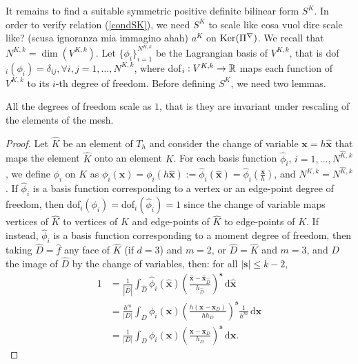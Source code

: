 It remains to find a suitable symmetric positive definite bilinear form $S^K$. In order to verify relation (\ref{condSK}), we need $S^K$ to scale like {\color{red} cosa vuol dire scale like? (scusa ignoranza mia immagino ahah)} $a^K$ on ${\rm Ker}(\Pi^\nabla)$. We recall that $N^{K,k} = \dim(V^{K,k})$. Let $\{\phi_i\}_{i=1}^{N^{K,k}}$ be the Lagrangian basis of $V^{K,k}$, that is dof$_i(\phi_i)=\delta_{ij}, \forall i,j=1,\ldots,N^{K,k}$, where dof$_i:V^{K,k}\rightarrow \mathbb{R}$ maps each function of $V^{K,k}$ to its $i$-th degree of freedom. Before defining $S^K$, we need two lemmas.

\begin{lemma}\label{lemma1}
All the degrees of freedom scale as $1$, that is they are invariant under rescaling of the elements of the mesh. 
\end{lemma}
\begin{proof}
Let $\hat{K}$ be an element of $T_h$ and consider the change of variable $\mathbf{x}=h\hat{\mathbf{x}}$ that maps the element $\hat{K}$ onto an element $K$. For each basis function $\hat{\phi}_i$, $i=1,\ldots,N^{\hat{K},k}$, we define $\phi_i$ on $K$ as $\phi_i(\mathbf{x}) = \phi_i(h\mathbf{\hat{x}}) := \hat{\phi}_i(\hat{\mathbf{x}}) = \hat{\phi}_i\left(\frac{\mathbf{x}}{h}\right)$, and $N^{K,k}=N^{\hat{K},k}$. If $\hat{\phi}_i$ is a basis function corresponding to a vertex or an edge-point degree of freedom, then dof$_i(\phi_i)=$dof$_i(\hat{\phi}_i) = 1$ since the change of variable maps vertices of $\hat{K}$ to vertices of $K$ and edge-points of $\hat{K}$ to edge-points of $K$. If instead, $\hat{\phi}_i$ is a basis function corresponding to a moment degree of freedom, then taking $\hat{D}=\hat{f}$ any face of $\hat{K}$ (if $d=3$) and $m=2$, or $\hat{D}=\hat{K}$ and $m=3$, and $D$ the image of $\hat{D}$ by the change of variables, then: for all $|\mathbf{s}|\leq k-2$, 
\begin{align*}
1&=\frac{1}{|\hat{D}|}\int_{\hat{D}} \hat{\phi}_i(\mathbf{\hat{x}}) \left(\frac{\mathbf{\hat{x}}-\mathbf{\hat{x}}_{\hat{D}}}{h_{\hat{D}}}\right)^\mathbf{s}\,\mathrm{d}\mathbf{\hat{x}} \\
&= \frac{h^m}{|D|}\int_D \phi_i(\mathbf{x})\left(\frac{ h\left(\mathbf{x}-\mathbf{x}_D\right)}{hh_D}\right)^\mathbf{s}\frac{1}{h^m}\,\mathrm{d}\mathbf{x} \\
&= \frac{1}{|D|} \int_D \phi_i(\mathbf{x})\left(\frac{\mathbf{x}-\mathbf{x}_D}{h_D}\right)^\mathbf{s}\,\mathrm{d}\mathbf{x}.
\end{align*} 
\end{proof}

